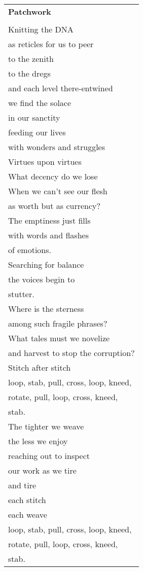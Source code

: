 \documentclass{article}
\begin{document}
\begin{center}
\begin{tabular}{l}
\textbf{Patchwork} \\
\\
Knitting the DNA \\
as reticles for us to peer \\
to the zenith \\
to the dregs \\
and each level there-entwined \\
we find the solace \\
in our sanctity \\
feeding our lives \\
with wonders and struggles \\
Virtues upon virtues \\
What decency do we lose \\
When we can't see our flesh \\
as worth but as currency? \\
The emptiness just fills \\
with words and flashes \\
of emotions. \\
Searching for balance \\
the voices begin to \\
stutter. \\
Where is the sterness \\
among such fragile phrases? \\
What tales must we novelize \\
and harvest to stop the corruption? \\
Stitch after stitch \\
loop, stab, pull, cross, loop, kneed, \\
rotate, pull, loop, cross, kneed, \\
stab. \\
The tighter we weave \\
the less we enjoy \\
reaching out to inspect \\
our work as we tire \\
and tire \\
each stitch \\
each weave \\
loop, stab, pull, cross, loop, kneed, \\
rotate, pull, loop, cross, kneed, \\
stab. \\
\end{tabular}
\end{center}
\end{document}

